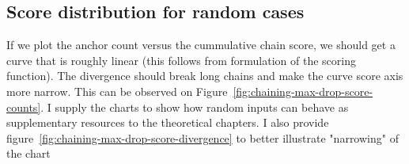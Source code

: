 
\subsection{Score distribution for random cases}

If we plot the anchor count versus the cummulative chain score, we should get a curve that is roughly linear (this follows from formulation of the scoring function).
The divergence should break long chains and make the curve score axis more narrow.
This can be observed on Figure~\ref{fig:chaining-max-drop-score-counts}. I supply the charts to show how random inputs can behave as supplementary resources to the theoretical chapters.
I also provide figure~\ref{fig:chaining-max-drop-score-divergence} to better illustrate "narrowing" of the chart 


